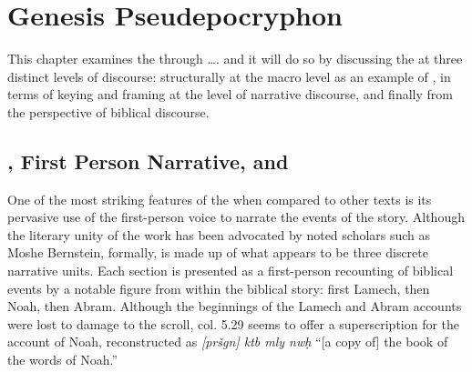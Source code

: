 \hypertarget{genesis-pseudepocryphon}{%
\chapter{Genesis Pseudepocryphon}\label{genesis-pseudepocryphon}}

This chapter examines the \ga through \ldots{}. and it
will do so by discussing the \ga at three distinct
levels of discourse: structurally at the macro level as an example of
\psy, in terms of keying and framing at the level of
narrative discourse, and finally from the perspective of biblical
discourse.

\hypertarget{ga-first-person-narrative-and-psy}{%
\section{\GA, First Person Narrative, and\Psy}\label{ga-first-person-narrative-and-psy}}

One of the most striking features of the \ga when
compared to other \rwb texts is its pervasive use of the
first-person voice to narrate the events of the story. Although the
literary unity of the work has been advocated by noted scholars such as
Moshe Bernstein, formally, \ga is made up of what
appears to be three discrete narrative
units.\autocite{bernstein_jbl2009} Each section is presented as a
first-person recounting of biblical events by a notable figure from
within the biblical story: first Lamech, then Noah, then Abram. Although
the beginnings of the Lamech and Abram accounts were lost to damage to
the scroll, col. 5.29 seems to offer a superscription for the account of
Noah, reconstructed as \emph{{[}pršgn{]} ktb mly nwḥ} ``{[}a copy of{]}
the book of the words of Noah.''

